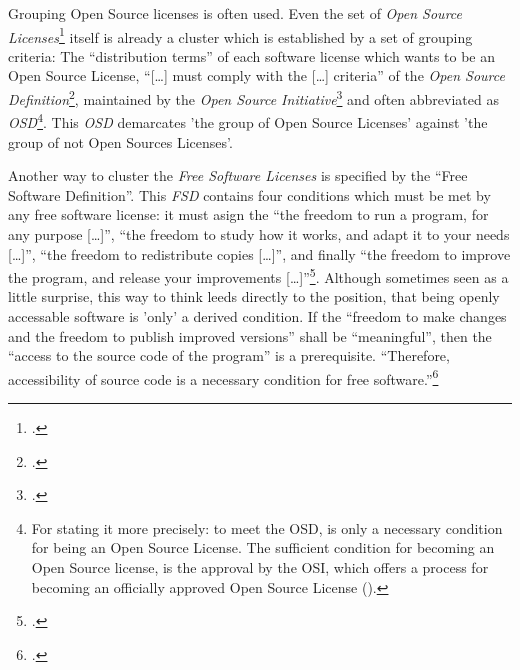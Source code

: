 %
%
%
%
%



Grouping Open Source licenses is often used. Even the set of \emph{Open Source
Li\-cen\-ses}\footcite[cf.][\nopage wp]{OSI2012b} itself is already a cluster
which is established by a set of grouping criteria: The \enquote{distribution
terms} of each software license which wants to be an Open Source License,
\enquote{[\ldots] must comply with the [\ldots] criteria} of the \emph{Open
Source Definition}\footcite[cf.][\nopage wp]{OSI2012a}, maintained by the
\emph{Open Source Initiative}\footcite[cf.][\nopage wp]{OSI2012c} and often
abbreviated as \emph{OSD}\footnote{For stating it more precisely: to meet the
OSD, is only a necessary condition for being an Open Source License. The
sufficient condition for becoming an Open Source license, is the approval by the
OSI, which offers a process for becoming an officially approved Open Source
License (\cite[cf.][\nopage wp.]{OSI2012d}).}. This \emph{OSD} demarcates 'the
group of Open Source Licenses' against 'the group of not Open Sources Licenses'.

Another way to cluster the \emph{Free Software Licenses} is specified by the
\enquote{Free Software Definition}. This \emph{FSD} contains four conditions
which must be met by any free software license: it must asign the \enquote{the
freedom to run a program, for any purpose [\ldots]}, \enquote{the freedom to
study how it works, and adapt it to your needs [\ldots]}, \enquote{the freedom
to redistribute copies [\ldots]}, and finally \enquote{the freedom to improve
the program, and release your improvements
[\ldots]}\footcite[cf.][41]{Stallman1996a}. Although sometimes seen as a little
surprise, this way to think leeds directly to the position, that being openly
accessable software is 'only' a derived condition. If the
\enquote{freedom to make changes and the freedom to publish improved versions}
shall be \enquote{meaningful}, then the \enquote{access to the source code of
the program} is a prerequisite. \enquote{Therefore, accessibility of source code
is a necessary condition for free software.}\footcite[cf.][41]{Stallman1996a}

